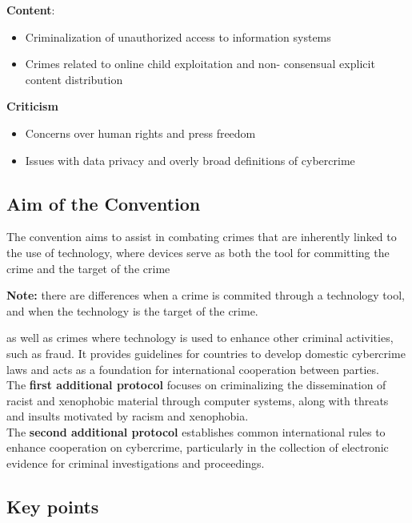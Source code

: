 \textbf{Content}:
\begin{itemize}[itemsep=0pt]
  \item Criminalization of unauthorized access to information systems
  \item Crimes related to online child exploitation and non- consensual explicit content distribution
\end{itemize}

\textbf{Criticism}
\begin{itemize}[itemsep=0pt]
  \item Concerns over human rights and press freedom
  \item Issues with data privacy and overly broad definitions of cybercrime
\end{itemize}

\subsection{Aim of the Convention}
The convention aims to assist in combating crimes that are inherently linked to the use of technology, where devices serve as both the tool for committing the crime and the target of the crime
\begin{boxH}
  \textbf{Note:} there are differences when a crime is commited through a technology tool, and when the technology is the target of the crime.
\end{boxH}
as well as crimes where technology is used to enhance other criminal activities, such as fraud. It provides guidelines for countries to develop domestic cybercrime laws and acts as a foundation for international cooperation between parties.\\The \textbf{first additional protocol} focuses on criminalizing the dissemination of racist and xenophobic material through computer systems, along with threats and insults motivated by racism and xenophobia.\\ The \textbf{second additional protocol} establishes common international rules to enhance cooperation on cybercrime, particularly in the collection of electronic evidence for criminal investigations and proceedings.

\subsection{Key points}

